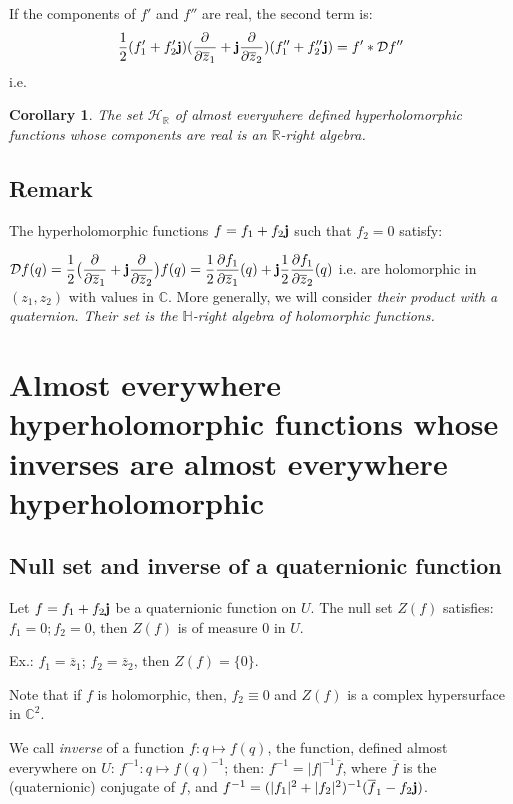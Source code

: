 \documentclass[12pt]{amsart}
\newtheorem{cor}[thm]{Corollary}
\theoremstyle{definition}
\begin{document}
If the components of $f'$ and $f''$ are real, the second term is: 
$$
\frac{1}{2}(f'_1+f'_2{\bf j})(\frac{\partial }{\partial\overline z_1}+{\bf j}\frac{\partial }{\partial\overline z_2})(f''_1+ f''_2{\bf j})=f'*
{\mathcal D}f''
$$
i.e.
\begin{cor}\label{Proposition 2.3.3} {\it The set ${\mathcal H}_{\mathbb R}$ of almost everywhere defined hyperholomorphic functions whose components are real is an ${\mathbb R}$-right algebra.} 
\end{cor} 

\subsection{Remark} The hyperholomorphic functions $f=f_1+f_2{\bf j}$ such that $f_2=0$ satisfy: 

$\displaystyle {\mathcal D} f(q)=\frac{1}{2}\big(\frac{\partial}{\partial\overline z_1}
+{\bf j}\frac{\partial}{\partial\overline z_2}\big) f(q)=\frac{1}{2}\frac{\partial
f_1}{\partial\overline z_1}(q)+{\bf j}\frac{1}{2}\frac{\partial f_1}{\partial\overline
z_2} (q)$ i.e. are holomorphic in $(z_1,z_2)$ with values in ${\mathbb{C}}$. 
\smallskip
More generally, we will consider {\it their product with a quaternion. Their set is the ${\mathbb H}$-right algebra of holomorphic functions.}

\section {Almost everywhere hyperholomorphic functions whose inverses are almost everywhere hyperholomorphic}

\subsection {Null set and inverse of a quaternionic function}

Let $f=f_1+f_2{\bf j}$ be a quaternionic function on $U$. 
The null set $Z(f)$ satisfies: $f_1=0; f_2=0$, then $Z(f)$ is of measure 0 in $U$. 

Ex.: $f_1=\overline z_1$; $f_2=\overline z_2$, then
$Z(f)=\{0\}$. 

Note that if $f$ is holomorphic, then, $f_2\equiv 0$
and $Z(f)$ is a complex hypersurface in ${\mathbb{C}}^2$.

We call {\it inverse} of a function $f: q\mapsto f(q)$, the function, defined almost everywhere on $U$: $f^{-1}: q\mapsto f(q)^{-1}$; then: $f^{-1}=\vert f\vert^{-1}\overline f$, where $\overline f$ is the (quaternionic) conjugate of $f$, and $f^{-1}=(\vert f_1\vert ^2+\vert f_2\vert ^2)^{-1}(\overline f_1-f_2{\bf j})$.
\end{document}
